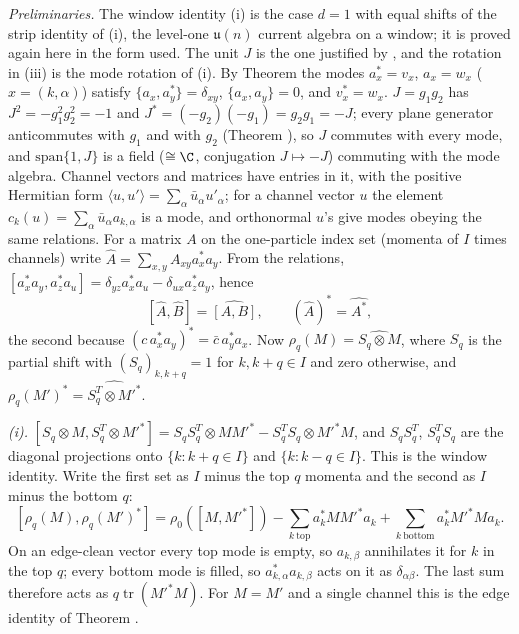 \emph{Preliminaries.} The window identity (i) is the case $d = 1$ with equal shifts of the strip identity of (i), the level-one $\mathfrak{u}(n)$ current algebra on a window; it is proved again here in the form used. The unit $J$ is the one justified by , and the rotation in (iii) is the mode rotation of (i). By Theorem  the modes $a_{x}^{*} = v_{x}$, $a_{x} = w_{x}$ ($x = (k, \alpha)$) satisfy $\{a_{x}, a_{y}^{*}\} = \delta_{xy}$, $\{a_{x}, a_{y}\} = 0$, and $v_{x}^{*} = w_{x}$. $J = g_{1}g_{2}$ has $J^{2} = -g_{1}^{2}g_{2}^{2} = -1$ and $J^{*} = (-g_{2})(-g_{1}) = g_{2}g_{1} = -J$; every plane generator anticommutes with $g_{1}$ and with $g_{2}$ (Theorem ), so $J$ commutes with every mode, and $\mathrm{span}\{1, J\}$ is a field ($\cong \C$, conjugation $J \mapsto -J$) commuting with the mode algebra. Channel vectors and matrices have entries in it, with the positive Hermitian form $\langle u, u'\rangle = \sum_{\alpha}\bar u_{\alpha}u'_{\alpha}$; for a channel vector $u$ the element $c_{k}(u) = \sum_{\alpha}\bar u_{\alpha}a_{k,\alpha}$ is a mode, and orthonormal $u$'s give modes obeying the same relations. For a matrix $A$ on the one-particle index set (momenta of $I$ times channels) write $\hat A = \sum_{x,y}A_{xy}a_{x}^{*}a_{y}$. From the relations, $[a_{x}^{*}a_{y}, a_{z}^{*}a_{u}] = \delta_{yz}a_{x}^{*}a_{u} - \delta_{ux}a_{z}^{*}a_{y}$, hence
\[
[\hat A, \hat B] = \widehat{[A, B]}, \qquad (\hat A)^{*} = \widehat{A^{*}} ,
\]
the second because $(c\,a_{x}^{*}a_{y})^{*} = \bar c\,a_{y}^{*}a_{x}$. Now $\rho_{q}(M) = \widehat{S_{q}\otimes M}$, where $S_{q}$ is the partial shift with $(S_{q})_{k,k+q} = 1$ for $k, k + q \in I$ and zero otherwise, and $\rho_{q}(M')^{*} = \widehat{S_{q}^{T}\otimes M'^{*}}$.

\emph{(i).} $[S_{q}\otimes M, S_{q}^{T}\otimes M'^{*}] = S_{q}S_{q}^{T}\otimes MM'^{*} - S_{q}^{T}S_{q}\otimes M'^{*}M$, and $S_{q}S_{q}^{T}$, $S_{q}^{T}S_{q}$ are the diagonal projections onto $\{k : k + q \in I\}$ and $\{k : k - q \in I\}$. This is the window identity. Write the first set as $I$ minus the top $q$ momenta and the second as $I$ minus the bottom $q$:
\[
[\rho_{q}(M), \rho_{q}(M')^{*}] = \rho_{0}([M, M'^{*}]) - \sum_{k\ \mathrm{top}}a_{k}^{*}MM'^{*}a_{k} + \sum_{k\ \mathrm{bottom}}a_{k}^{*}M'^{*}Ma_{k} .
\]
On an edge-clean vector every top mode is empty, so $a_{k,\beta}$ annihilates it for $k$ in the top $q$; every bottom mode is filled, so $a_{k,\alpha}^{*}a_{k,\beta}$ acts on it as $\delta_{\alpha\beta}$. The last sum therefore acts as $q\operatorname{tr}(M'^{*}M)$. For $M = M'$ and a single channel this is the edge identity of Theorem .

